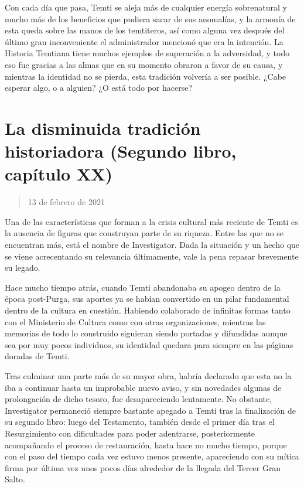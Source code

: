 \documentclass[
]{book}
\begin{document}
Con cada día que pasa, Temti se aleja más de cualquier energía sobrenatural y mucho más de los beneficios que pudiera sacar de sus anomalías, y la armonía de esta queda sobre las manos de los temtiteros, así como alguna vez después del último gran inconveniente el administrador mencionó que era la intención. La Historia Temtiana tiene muchos ejemplos de superación a la adversidad, y todo eso fue gracias a las almas que en su momento obraron a favor de su causa, y mientras la identidad no se pierda, esta tradición volvería a ser posible. ¿Cabe esperar algo, o a alguien? ¿O está todo por hacerse?

\hypertarget{la-disminuida-tradiciuxf3n-historiadora-segundo-libro-capuxedtulo-xx}{%
\section{La disminuida tradición historiadora (Segundo libro, capítulo XX)}\label{la-disminuida-tradiciuxf3n-historiadora-segundo-libro-capuxedtulo-xx}}

\begin{quote}
13 de febrero de 2021
\end{quote}

Una de las características que forman a la crisis cultural más reciente de Temti es la ausencia de figuras que construyan parte de su riqueza. Entre las que no se encuentran más, está el nombre de Investigator. Dada la situación y un hecho que se viene acrecentando su relevancia últimamente, vale la pena repasar brevemente su legado.

Hace mucho tiempo atrás, cuando Temti abandonaba su apogeo dentro de la época post-Purga, sus aportes ya se habían convertido en un pilar fundamental dentro de la cultura en cuestión. Habiendo colaborado de infinitas formas tanto con el Ministerio de Cultura como con otras organizaciones, mientras las memorias de todo lo construido siguieran siendo portadas y difundidas aunque sea por muy pocos individuos, su identidad quedara para siempre en las páginas doradas de Temti.

Tras culminar una parte más de su mayor obra, habría declarado que esta no la iba a continuar hasta un improbable nuevo aviso, y sin novedades algunas de prolongación de dicho tesoro, fue desapareciendo lentamente. No obstante, Investigator permaneció siempre bastante apegado a Temti tras la finalización de su segundo libro: luego del Testamento, también desde el primer día tras el Resurgimiento con dificultades para poder adentrarse, posteriormente acompañando el proceso de restauración, hasta hace no mucho tiempo, porque con el paso del tiempo cada vez estuvo menos presente, apareciendo con su mítica firma por última vez unos pocos días alrededor de la llegada del Tercer Gran Salto.
\end{document}
